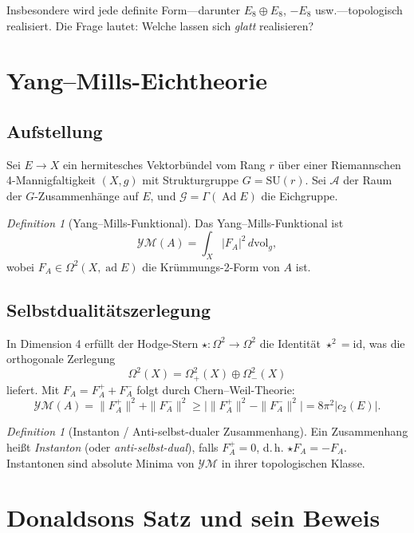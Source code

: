 \documentclass[12pt,a4paper]{amsart}
\theoremstyle{definition}
\theoremstyle{remark}
\newtheorem{definition_de}[theorem]{Definition}
\DeclareMathOperator{\Ad}{Ad}
\DeclareMathOperator{\ad}{ad}
\begin{document}
Insbesondere wird jede definite Form---darunter $E_8 \oplus E_8$,
$-E_8$ usw.---topologisch realisiert.  Die Frage lautet: Welche lassen sich
\emph{glatt} realisieren?

\section{Yang--Mills-Eichtheorie}

\subsection{Aufstellung}

Sei $E \to X$ ein hermitesches Vektorbündel vom Rang $r$ über einer
Riemannschen 4-Mannigfaltigkeit $(X,g)$ mit Strukturgruppe
$G = \mathrm{SU}(r)$.  Sei $\mathcal{A}$ der Raum der $G$-Zusammenhänge
auf $E$, und $\mathcal{G} = \Gamma(\Ad E)$ die Eichgruppe.

\begin{definition_de}[Yang--Mills-Funktional]
Das Yang--Mills-Funktional ist
\[
  \mathcal{YM}(A) = \int_X |F_A|^2\,d\mathrm{vol}_g,
\]
wobei $F_A \in \Omega^2(X, \ad E)$ die Krümmungs-2-Form von $A$ ist.
\end{definition_de}

\subsection{Selbstdualitätszerlegung}

In Dimension 4 erfüllt der Hodge-Stern $\star \colon \Omega^2 \to \Omega^2$
die Identität $\star^2 = \mathrm{id}$, was die orthogonale Zerlegung
\[
  \Omega^2(X) = \Omega^2_+(X) \oplus \Omega^2_-(X)
\]
liefert.  Mit $F_A = F_A^+ + F_A^-$ folgt durch Chern--Weil-Theorie:
\[
  \mathcal{YM}(A) = \|F_A^+\|^2 + \|F_A^-\|^2
  \ge \bigl|\|F_A^+\|^2 - \|F_A^-\|^2\bigr| = 8\pi^2 |c_2(E)|.
\]

\begin{definition_de}[Instanton / Anti-selbst-dualer Zusammenhang]
Ein Zusammenhang heißt \emph{Instanton} (oder \emph{anti-selbst-dual}),
falls $F_A^+ = 0$, d.\,h. $\star F_A = -F_A$.  Instantonen sind absolute
Minima von $\mathcal{YM}$ in ihrer topologischen Klasse.
\end{definition_de}

\section{Donaldsons Satz und sein Beweis}
\end{document}
